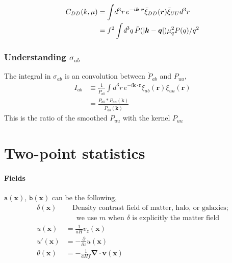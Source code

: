 \documentclass[a4paper,11pt, fleqn]{article}
\newcommand{\dbar}{\textit{\dj}}
\begin{document}
\begin{align}
  C_{DD}(k, \mu) &=
    \int\! d^3 r \, e^{-i\bm{k}\cdot\bm{r}}
    \bar{\xi}_{DD}(\bm{r}) \bar{\xi}_{UU}d^3 r\\
  &= f^2 \int \! \dbar^3 q \, \bar{P}(|\bm{k} - \bm{q}|) \mu_q^2 P(q)/q^2
\end{align}

\clearpage
\subsubsection{Understanding $\sigma_{ab}$}

The integral in $\sigma_{ab}$ is an convolution between $\mathring{P}_{ab}$ and
$P_{uu}$,
%
\begin{align}
  I_{ab} &\equiv \frac{1}{\mathring{P}_{ab}}
  \int \! d^3 r \, e^{-i\bm{k}\cdot\bm{r}}
  \xi_{ab}(\bm{r}) \xi_{uu}(\bm{r})\\
  &= \frac{P_{ab} * P_{uu}(\bm{k})}{\mathring{P}_{ab}(\bm{k})}
\end{align}
%
This is the ratio of the smoothed $P_{uu}$ with the kernel $P_{uu}$


%
%
\sectionfont{\sffamily\Huge\color{Blue}\selectfont}
\subsectionfont{\sffamily\color{Blue}\selectfont}
\subsubsectionfont{\sffamily\color{Blue}\selectfont}
\paragraphfont{\sffamily\color{Blue}\selectfont}

%
%

\clearpage
\section{Two-point statistics}

\paragraph{Fields}
$\mathtt{a}(\bm{x})$, $\mathtt{b}(\bm{x})$ can be the following,
%
\begin{align}
  \delta(\bm{x}) &\phantom{=\,} \mbox{Density contrast field of matter, halo, or galaxies;}\\
            &\phantom{=\,} \mbox{we use $m$ when $\delta$ is explicitly the matter field}\\
  u(\bm{x}) &= \frac{1}{aH} v_z(\bm{x})\\
  u'(\bm{x}) &= -\frac{\partial}{\partial z} u(\bm{x})\\
  \theta(\bm{x}) &= - \frac{1}{aHf} \bm{\nabla}\cdot \bm{v}(\bm{x})
\end{align}
\end{document}
